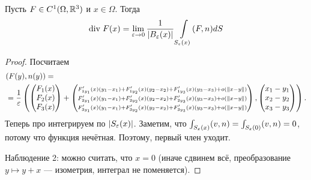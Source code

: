 \begin{thm}
 Пусть $F \in C^{1}(\Omega, \mathbb{R}^{3})$ и $x \in \Omega$. Тогда
 \begin{align*}
  \mathrm{div}\;F(x) = \lim_{\varepsilon \to 0} \frac{1}{\left| B_{\varepsilon}(x) \right|} \int\limits_{S_{\varepsilon}(x)} (F,n) dS
 \end{align*} 
\end{thm}
\begin{proof}
 Посчитаем
 \begin{align*}
  &(F(y), n(y)) = \\
  &= \frac{1}{\varepsilon}\left(  \begin{pmatrix}
   F_1(x) \\
   F_2(x) \\
   F_3(x)
  \end{pmatrix} + \begin{pmatrix}
  \scriptstyle F'_{1y_1}(x) \left( y_1-x_1 \right) + F'_{1y_2}(x) (y_2 -x_2) + F'_{1y_3}(x) (y_3-x_3) + o \left( \left\| x-y \right\| \right) \\
  \scriptstyle F'_{2y_1}(x) \left( y_1-x_1 \right) + F'_{2y_2}(x) (y_2 -x_2) + F'_{2y_3}(x) (y_3-x_3) + o \left( \left\| x-y \right\| \right) \\
  \scriptstyle F'_{3y_1}(x) \left( y_1-x_1 \right) + F'_{3y_2}(x) (y_2 -x_2) + F'_{3y_3}(x) (y_3-x_3) + o \left( \left\| x-y \right\| \right) \\
  \end{pmatrix}, \begin{pmatrix}
   x_1 - y_1 \\
   x_2-y_2\\
   x_3-y_3
  \end{pmatrix}\right)
 .\end{align*} 
Теперь про интегрируем по $|S_\varepsilon(x)|$.  Заметим, что $\int_{S_{\varepsilon}(x)} (v, n) = \int_{S_{\varepsilon}(0)} (v, n) = 0  $, потому что функция нечётная. Поэтому, первый член уходит.

 Наблюдение 2: можно считать, что $x = 0$ (иначе сдвинем всё, преобразование $y \mapsto y + x$ --- изометрия, интеграл не поменяется).


\end{proof}

